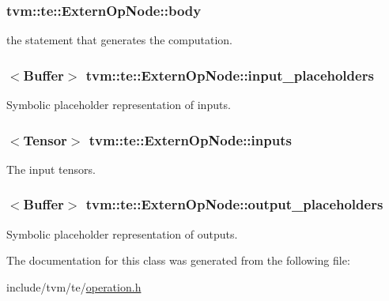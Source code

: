 \subsubsection[{\texorpdfstring{body}{body}}]{ tvm\+::te\+::\+Extern\+Op\+Node\+::body}\hypertarget{classtvm_1_1te_1_1ExternOpNode_a962b2cfaa4a2141c1b9247ac634b7bf2}{}\label{classtvm_1_1te_1_1ExternOpNode_a962b2cfaa4a2141c1b9247ac634b7bf2}


the statement that generates the computation. 

\subsubsection[{\texorpdfstring{input\+\_\+placeholders}{input_placeholders}}]{$<${\bf Buffer}$>$ tvm\+::te\+::\+Extern\+Op\+Node\+::input\+\_\+placeholders}\hypertarget{classtvm_1_1te_1_1ExternOpNode_ae5c3fa995ba59e0e001d6b8f92e39c7a}{}\label{classtvm_1_1te_1_1ExternOpNode_ae5c3fa995ba59e0e001d6b8f92e39c7a}


Symbolic placeholder representation of inputs. 

\subsubsection[{\texorpdfstring{inputs}{inputs}}]{$<${\bf Tensor}$>$ tvm\+::te\+::\+Extern\+Op\+Node\+::inputs}\hypertarget{classtvm_1_1te_1_1ExternOpNode_a12bd3ed18f9735abe6850766132eeb4c}{}\label{classtvm_1_1te_1_1ExternOpNode_a12bd3ed18f9735abe6850766132eeb4c}


The input tensors. 

\subsubsection[{\texorpdfstring{output\+\_\+placeholders}{output_placeholders}}]{$<${\bf Buffer}$>$ tvm\+::te\+::\+Extern\+Op\+Node\+::output\+\_\+placeholders}\hypertarget{classtvm_1_1te_1_1ExternOpNode_a004d2ec4a439339a2067e4fe7b93dac8}{}\label{classtvm_1_1te_1_1ExternOpNode_a004d2ec4a439339a2067e4fe7b93dac8}


Symbolic placeholder representation of outputs. 



The documentation for this class was generated from the following file\+:\begin{DoxyCompactItemize}
\item 
include/tvm/te/\hyperlink{operation_8h}{operation.\+h}\end{DoxyCompactItemize}
